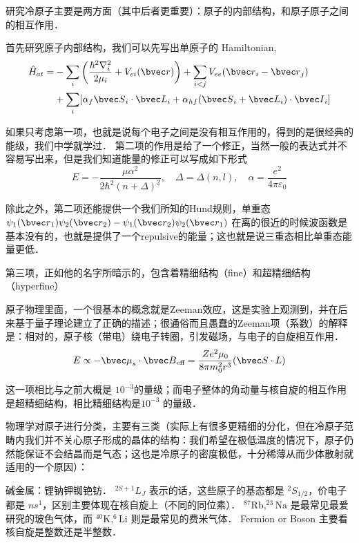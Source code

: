 
研究冷原子主要是两方面（其中后者更重要）：原子的内部结构，和原子原子之间的相互作用．

首先研究原子内部结构，我们可以先写出单原子的 Hamiltonian,
\begin{equation}
\begin{split}
\hat{H}_{at}=&-\sum_i\left(\frac{\hbar^2\nabla_i^2}{2\mu_i}+V_{ei}({\bvec r})\right) + \sum_{i<j}V_{ee}({\bvec r}_i-{\bvec r}_j)\\
&+\sum_i [\alpha_f {\bvec S}_i\cdot{\bvec L}_i+\alpha_{hf}({\bvec S}_i+{\bvec L}_i)\cdot {\bvec I}_i]
\end{split}
\end{equation}

如果只考虑第一项，也就是说每个电子之间是没有相互作用的，得到的是很经典的能级，我们中学就学过． 第二项的作用是给了一个修正，当然一般的表达式并不容易写出来，但是我们知道能量的修正可以写成如下形式
\begin{equation}
E = -\frac{\mu\alpha^2}{2\hbar^2(n+\Delta)^2},\quad \Delta = \Delta(n,l),\quad \alpha = \frac{e^2}{4\pi\varepsilon_0}
\end{equation}

除此之外，第二项还能提供一个我们所知的Hund规则，单重态 $\psi_1({\bvec r}_1)\psi_2({\bvec r}_2)-\psi_1({\bvec r}_2)\psi_2({\bvec r}_1)$ 在离的很近的时候波函数是基本没有的，也就是提供了一个repulsive的能量；这也就是说三重态相比单重态能量更低．

第三项，正如他的名字所暗示的，包含着精细结构（fine）和超精细结构（hyperfine）

原子物理里面，一个很基本的概念就是Zeeman效应，这是实验上观测到，并在后来基于量子理论建立了正确的描述；很通俗而且愚蠢的Zeeman项（系数）的解释是：相对的，原子核（带电）绕电子转圈，引发磁场，与电子的自旋相互作用．
\begin{equation}
E\propto -{\bvec\mu}_s\cdot{\bvec B}_{\text{eff}}=\frac{Ze^2\mu_0}{8\pi m_0^2 r^3}({\bvec S\cdot L})
\end{equation}

这一项相比与之前大概是 $10^{-3}$的量级；而电子整体的角动量与核自旋的相互作用是超精细结构，相比精细结构是$10^{-3}$ 的量级．

物理学对原子进行分类，主要有三类（实际上有很多更精细的分化，但在冷原子范畴内我们并不关心原子形成的晶体的结构：我们希望在极低温度的情况下，原子仍然能保证不会结晶而是气态；这也是冷原子的密度极低，十分稀薄从而少体散射就适用的一个原因）：

碱金属：锂钠钾铷铯钫． $^{2S+1}L_J$ 表示的话，这些原子的基态都是 $^2 S_{1/2}$，价电子都是 $ns^1$，区别主要体现在核自旋上（不同的同位素）． $^{87}\text{Rb}, ^{23}\text{Na}$ 是最常见最爱研究的玻色气体，而 $^{40}\text{K}, ^6 \text{Li}$ 则是最常见的费米气体． Fermion or Boson 主要看核自旋是整数还是半整数．

